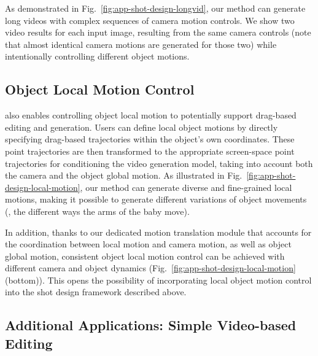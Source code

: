 As demonstrated in Fig.~\ref{fig:app-shot-design-longvid}, our method can generate long videos with complex sequences of camera motion controls. We show two video results for each input image, resulting from the same camera controls (note that almost identical camera motions are generated for those two) while intentionally controlling different object motions.


\subsection{Object Local Motion Control}

\MOCA also enables controlling object local motion to potentially support drag-based editing and generation. 
Users can define local object motions by directly specifying drag-based trajectories within the object's own coordinates. These point trajectories are then transformed to the appropriate screen-space point trajectories for conditioning the video generation model, taking into account both the camera and the object global motion. 
As illustrated in Fig.~\ref{fig:app-shot-design-local-motion}, our method can generate diverse and fine-grained local motions, making it possible to generate different variations of object movements (\eg, the different ways the arms of the baby move).

In addition, thanks to our dedicated motion translation module that accounts for the coordination between local motion and camera motion, as well as object global motion,
consistent object local motion control can be achieved with different camera and object dynamics (Fig.~\ref{fig:app-shot-design-local-motion} (bottom)). 
This opens the possibility of incorporating local object motion control into the shot design framework described above.



\subsection{Additional Applications: Simple Video-based Editing}

